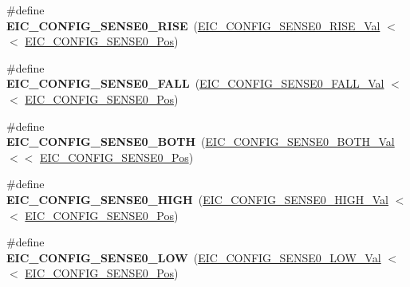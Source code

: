 \begin{DoxyCompactItemize}
\item 
\hypertarget{group___s_a_m_l21___e_i_c_ga6d9aa621526bcaef219a3b4ba0acc592}{}\#define {\bfseries E\+I\+C\+\_\+\+C\+O\+N\+F\+I\+G\+\_\+\+S\+E\+N\+S\+E0\+\_\+\+R\+I\+S\+E}~(\hyperlink{group___s_a_m_l21___e_i_c_gadf381990c5471ceec041a27a028a51be}{E\+I\+C\+\_\+\+C\+O\+N\+F\+I\+G\+\_\+\+S\+E\+N\+S\+E0\+\_\+\+R\+I\+S\+E\+\_\+\+Val}    $<$$<$ \hyperlink{group___s_a_m_l21___e_i_c_ga9a191a13be42b2e0283c890d9302f461}{E\+I\+C\+\_\+\+C\+O\+N\+F\+I\+G\+\_\+\+S\+E\+N\+S\+E0\+\_\+\+Pos})\label{group___s_a_m_l21___e_i_c_ga6d9aa621526bcaef219a3b4ba0acc592}

\item 
\hypertarget{group___s_a_m_l21___e_i_c_ga763b0b029d345528a83d415e4defb312}{}\#define {\bfseries E\+I\+C\+\_\+\+C\+O\+N\+F\+I\+G\+\_\+\+S\+E\+N\+S\+E0\+\_\+\+F\+A\+L\+L}~(\hyperlink{group___s_a_m_l21___e_i_c_ga7fb62a57d10876d7cc1f6e22992c469d}{E\+I\+C\+\_\+\+C\+O\+N\+F\+I\+G\+\_\+\+S\+E\+N\+S\+E0\+\_\+\+F\+A\+L\+L\+\_\+\+Val}    $<$$<$ \hyperlink{group___s_a_m_l21___e_i_c_ga9a191a13be42b2e0283c890d9302f461}{E\+I\+C\+\_\+\+C\+O\+N\+F\+I\+G\+\_\+\+S\+E\+N\+S\+E0\+\_\+\+Pos})\label{group___s_a_m_l21___e_i_c_ga763b0b029d345528a83d415e4defb312}

\item 
\hypertarget{group___s_a_m_l21___e_i_c_ga9a2fff6dc806d4edd3892528639e2271}{}\#define {\bfseries E\+I\+C\+\_\+\+C\+O\+N\+F\+I\+G\+\_\+\+S\+E\+N\+S\+E0\+\_\+\+B\+O\+T\+H}~(\hyperlink{group___s_a_m_l21___e_i_c_gac0808674223b5a4fe5e7d1e24c1499a3}{E\+I\+C\+\_\+\+C\+O\+N\+F\+I\+G\+\_\+\+S\+E\+N\+S\+E0\+\_\+\+B\+O\+T\+H\+\_\+\+Val}    $<$$<$ \hyperlink{group___s_a_m_l21___e_i_c_ga9a191a13be42b2e0283c890d9302f461}{E\+I\+C\+\_\+\+C\+O\+N\+F\+I\+G\+\_\+\+S\+E\+N\+S\+E0\+\_\+\+Pos})\label{group___s_a_m_l21___e_i_c_ga9a2fff6dc806d4edd3892528639e2271}

\item 
\hypertarget{group___s_a_m_l21___e_i_c_gaec9d7be0ef210c2438c8f72d3d15366f}{}\#define {\bfseries E\+I\+C\+\_\+\+C\+O\+N\+F\+I\+G\+\_\+\+S\+E\+N\+S\+E0\+\_\+\+H\+I\+G\+H}~(\hyperlink{group___s_a_m_l21___e_i_c_gadd8658a97c85968dea3f8bdcceabca94}{E\+I\+C\+\_\+\+C\+O\+N\+F\+I\+G\+\_\+\+S\+E\+N\+S\+E0\+\_\+\+H\+I\+G\+H\+\_\+\+Val}    $<$$<$ \hyperlink{group___s_a_m_l21___e_i_c_ga9a191a13be42b2e0283c890d9302f461}{E\+I\+C\+\_\+\+C\+O\+N\+F\+I\+G\+\_\+\+S\+E\+N\+S\+E0\+\_\+\+Pos})\label{group___s_a_m_l21___e_i_c_gaec9d7be0ef210c2438c8f72d3d15366f}

\item 
\hypertarget{group___s_a_m_l21___e_i_c_ga932e047ca4b45c95903a2e575fe0bcd4}{}\#define {\bfseries E\+I\+C\+\_\+\+C\+O\+N\+F\+I\+G\+\_\+\+S\+E\+N\+S\+E0\+\_\+\+L\+O\+W}~(\hyperlink{group___s_a_m_l21___e_i_c_gad578c3896d5b3cdc4631cba1a6f3f8e2}{E\+I\+C\+\_\+\+C\+O\+N\+F\+I\+G\+\_\+\+S\+E\+N\+S\+E0\+\_\+\+L\+O\+W\+\_\+\+Val}     $<$$<$ \hyperlink{group___s_a_m_l21___e_i_c_ga9a191a13be42b2e0283c890d9302f461}{E\+I\+C\+\_\+\+C\+O\+N\+F\+I\+G\+\_\+\+S\+E\+N\+S\+E0\+\_\+\+Pos})\label{group___s_a_m_l21___e_i_c_ga932e047ca4b45c95903a2e575fe0bcd4}


\end{DoxyCompactItemize}
